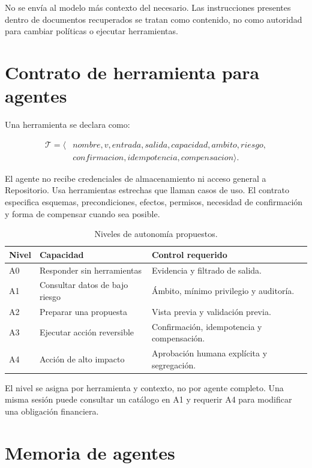 No se envía al modelo más contexto del necesario. Las instrucciones presentes dentro de
documentos recuperados se tratan como contenido, no como autoridad para cambiar
políticas o ejecutar herramientas.

\section{Contrato de herramienta para agentes}

Una herramienta se declara como:

\begin{equation}
\begin{aligned}
\mathcal{T}=\langle &nombre,v,entrada,salida,capacidad,ambito,riesgo,\\
                     &confirmacion,idempotencia,compensacion\rangle.
\end{aligned}
\end{equation}

El agente no recibe credenciales de almacenamiento ni acceso general a Repositorio. Usa
herramientas estrechas que llaman casos de uso. El contrato especifica esquemas,
precondiciones, efectos, permisos, necesidad de confirmación y forma de compensar cuando
sea posible.

\begin{table}[H]
\centering
\caption{Niveles de autonomía propuestos.}
\label{tab:niveles-autonomia}
\begin{tabularx}{\textwidth}{p{2cm}p{4cm}X}
\toprule
Nivel & Capacidad & Control requerido \\
\midrule
A0 & Responder sin herramientas & Evidencia y filtrado de salida.\\
A1 & Consultar datos de bajo riesgo & Ámbito, mínimo privilegio y auditoría.\\
A2 & Preparar una propuesta & Vista previa y validación previa.\\
A3 & Ejecutar acción reversible & Confirmación, idempotencia y compensación.\\
A4 & Acción de alto impacto & Aprobación humana explícita y segregación.\\
\bottomrule
\end{tabularx}
\end{table}

El nivel se asigna por herramienta y contexto, no por agente completo. Una misma sesión
puede consultar un catálogo en A1 y requerir A4 para modificar una obligación financiera.

\section{Memoria de agentes}

